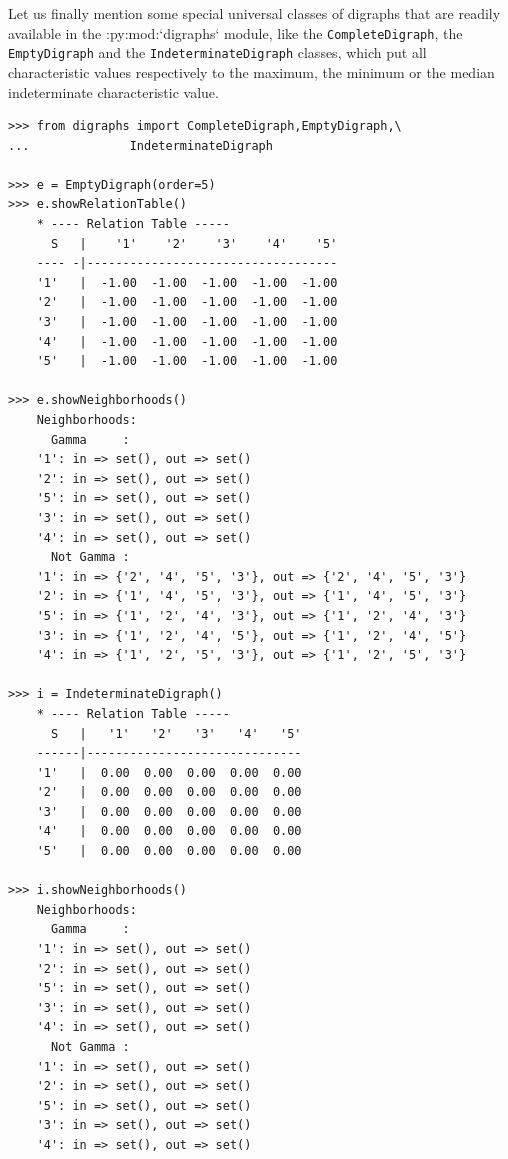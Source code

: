 Let us finally mention some special universal classes of digraphs that are readily available in the :py:mod:`digraphs` module, like the \texttt{CompleteDigraph}, the \texttt{EmptyDigraph} and the \texttt{IndeterminateDigraph} classes, which put all characteristic values respectively to the maximum, the minimum or the median indeterminate characteristic value.
\begin{lstlisting}[caption={Complete, empty and indeterminate digraphs},label=list:2.11]
>>> from digraphs import CompleteDigraph,EmptyDigraph,\
...   			 IndeterminateDigraph
   
>>> e = EmptyDigraph(order=5)
>>> e.showRelationTable()
    * ---- Relation Table -----
      S   |    '1'    '2'    '3'    '4'	   '5'	  
    ---- -|-----------------------------------
    '1'   |  -1.00  -1.00  -1.00  -1.00	 -1.00	 
    '2'   |  -1.00  -1.00  -1.00  -1.00	 -1.00	 
    '3'   |  -1.00  -1.00  -1.00  -1.00	 -1.00	 
    '4'   |  -1.00  -1.00  -1.00  -1.00	 -1.00	 
    '5'   |  -1.00  -1.00  -1.00  -1.00	 -1.00

>>> e.showNeighborhoods() 
    Neighborhoods:
      Gamma     :
    '1': in => set(), out => set()
    '2': in => set(), out => set()
    '5': in => set(), out => set()
    '3': in => set(), out => set()
    '4': in => set(), out => set()
      Not Gamma :
    '1': in => {'2', '4', '5', '3'}, out => {'2', '4', '5', '3'}
    '2': in => {'1', '4', '5', '3'}, out => {'1', '4', '5', '3'}
    '5': in => {'1', '2', '4', '3'}, out => {'1', '2', '4', '3'}
    '3': in => {'1', '2', '4', '5'}, out => {'1', '2', '4', '5'}
    '4': in => {'1', '2', '5', '3'}, out => {'1', '2', '5', '3'}

>>> i = IndeterminateDigraph()
    * ---- Relation Table -----
      S   |   '1'   '2'	  '3'	'4'   '5'	  
    ------|------------------------------
    '1'   |  0.00  0.00	 0.00  0.00  0.00	 
    '2'   |  0.00  0.00	 0.00  0.00  0.00	 
    '3'   |  0.00  0.00	 0.00  0.00  0.00	 
    '4'   |  0.00  0.00	 0.00  0.00  0.00	 
    '5'   |  0.00  0.00	 0.00  0.00  0.00	 

>>> i.showNeighborhoods()
    Neighborhoods:
      Gamma     :
    '1': in => set(), out => set()
    '2': in => set(), out => set()
    '5': in => set(), out => set()
    '3': in => set(), out => set()
    '4': in => set(), out => set()
      Not Gamma :
    '1': in => set(), out => set()
    '2': in => set(), out => set()
    '5': in => set(), out => set()
    '3': in => set(), out => set()
    '4': in => set(), out => set()
\end{lstlisting}

